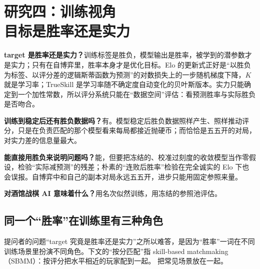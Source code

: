 \chapter[研究四：训练视角——目标是胜率还是实力]{研究四：训练视角\\目标是胜率还是实力}
\label{ch:ml}

\begin{answerbox}
\textbf{target 是胜率还是实力？}训练标签是胜负，模型输出是胜率，被学到的潜参数才是实力；只有在自博弈里，胜率本身才是优化目标。Elo 的更新式正好是“以胜负为标签、以评分差的逻辑斯蒂函数为预测”的对数损失上的一步随机梯度下降，$K$ 就是学习率；TrueSkill 是学习率随不确定度自动变化的贝叶斯版本。实力只能确定到一个加性常数，所以评分系统只能在“数据空间”评估：看预测胜率与实际胜负是否吻合。

\textbf{训练到稳定后还有胜负数据吗？}有。模型稳定后胜负数据照样产生、照样推动评分，只是在负责匹配的那个模型看来每局都接近抛硬币；而恰恰是五五开的对局，对实力差的信息量最大。

\textbf{能直接用胜负来说明问题吗？}能，但要把冻结的、校准过刻度的收敛模型当作零假设，检验“实际减预测”的残差；朴素的“连败后胜率”检验在完全诚实的 Elo 下也会误报。自博弈中和自己的副本对局永远五五开，进步只能用固定参照来量。

\textbf{对酒馆战棋 AI 意味着什么？}用名次似然训练，用冻结的参照池评估。
\end{answerbox}

\section{同一个“胜率”在训练里有三种角色}
\label{sec:ch4-roles}

提问者的问题“target 究竟是胜率还是实力”之所以难答，是因为“胜率”一词在不同训练场景里扮演不同角色。下文的“按分匹配”指 skill-based matchmaking（SBMM）：按评分把水平相近的玩家配到一起。 把常见场景放在一起。

